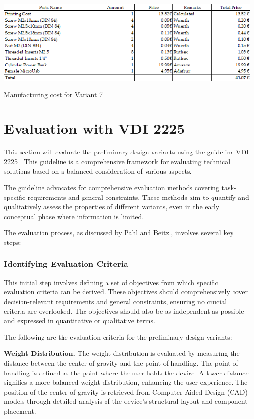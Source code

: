 \begin{table}[H]
    \centering
    \includegraphics[width=\linewidth]{texs/Part1/chapter3/image/v7manu.png}
    \caption{Manufacturing cost for Variant 7}
    \label{tab:manufacturing_cost_variant_7}
\end{table}

\section{Evaluation with VDI 2225}
This section will evaluate the preliminary design variants using the guideline VDI 2225 \cite[109-110]{Pahl2007}. This guideline is a comprehensive framework for evaluating technical solutions based on a balanced consideration of various aspects.

The guideline advocates for comprehensive evaluation methods covering task-specific requirements and general constraints. These methods aim to quantify and qualitatively assess the properties of different variants, even in the early conceptual phase where information is limited.

The evaluation process, as discussed by Pahl and Beitz \cite[110-124]{Pahl2007}, involves several key steps:

\subsubsection{Identifying Evaluation Criteria}
This initial step involves defining a set of objectives from which specific evaluation criteria can be derived. These objectives should comprehensively cover decision-relevant requirements and general constraints, ensuring no crucial criteria are overlooked. The objectives should also be as independent as possible and expressed in quantitative or qualitative terms.

The following are the evaluation criteria for the preliminary design variants:

\textbf{Weight Distribution:} The weight distribution is evaluated by measuring the distance between the center of gravity and the point of handling. The point of handling is defined as the point where the user holds the device. A lower distance signifies a more balanced weight distribution, enhancing the user experience. The position of the center of gravity is retrieved from Computer-Aided Design (CAD) models through detailed analysis of the device's structural layout and component placement.

